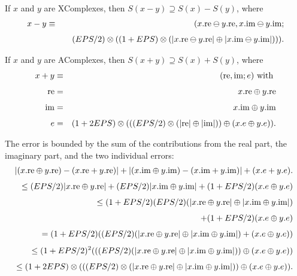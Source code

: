 If $x$ and $y$ are {\rm XComplexes,} then 
$S(x - y) \supseteq S(x) - S(y)${\rm ,} where
\begin{eqnarray*}
x - y &\equiv& (x.{\rm re} \ominus y.{\rm re}, x.{\rm im} \ominus y.{\rm im};\\[4pt]
&&\quad 
(EPS/2)\otimes ((1 + EPS) \otimes (|x.{\rm re} \ominus y.{\rm re}| \oplus |x.{\rm im} \ominus y.{\rm im}|))).
\end{eqnarray*} \endproclaim


If $x$ and $y$ are {\rm AComplexes,} then 
$S(x + y) \supseteq S(x) + S(y)${\rm ,} where
\begin{eqnarray*}
 x+y &\equiv& ({\rm re},{\rm im};e) \hbox{ with }\\[4pt]
{\rm re}& =& x.{\rm re} \oplus y.{\rm re}\\[4pt]
{\rm im}& =& x.{\rm im} \oplus y.{\rm im}\\[4pt]
e& =& (1 + 2 EPS) \otimes ( ((EPS/2) \otimes (|{\rm re}| \oplus |{\rm im}|))
 \oplus (x.e \oplus y.e)). \end{eqnarray*}
\endproclaim

The error is bounded by the sum of the contributions from the real part, the imaginary part, and the two individual errors:
\begin{eqnarray*}
 & &\hskip-20pt |(x.{\rm re} \oplus y.{\rm re}) -(x.{\rm re} + y.{\rm re})| + |(x.{\rm im} \oplus y.{\rm im}) -
(x.{\rm im} + y.{\rm im})| + (x.e + y.e).\\[4pt]
&&\hskip-12pt \le (EPS/2) |x.{\rm re} \oplus y.{\rm re}| + (EPS/2) |x.{\rm im} \oplus y.{\rm im}| + 
(1 + EPS/2) (x.e \oplus y.e)\\[4pt]
&&\hskip-12pt \le  (1 + EPS/2) (EPS/2)(|x.{\rm re} \oplus y.{\rm re}| \oplus 
 |x.{\rm im} \oplus y.{\rm im}| ) \\[4pt]
&&\hskip-12pt \qquad + (1 + EPS/2) (x.e \oplus y.e)\\[4pt]
&&\hskip-12pt = (1 + EPS/2) ((EPS/2)(|x.{\rm re} \oplus y.{\rm re}| \oplus 
 |x.{\rm im} \oplus y.{\rm im}| ) + (x.e \oplus y.e))\\[4pt]
&&\hskip-12pt \le (1 + EPS/2)^2 (((EPS/2) (|x.{\rm re} \oplus y.{\rm re}| \oplus 
 |x.{\rm im} \oplus y.{\rm im}| )) \oplus  (x.e \oplus y.e))\\[4pt]
&&\hskip-12pt \le   (1 + 2 EPS) \otimes (((EPS/2)\otimes (|x.{\rm re} \oplus
y.{\rm re}| \oplus |x.{\rm im} \oplus y.{\rm im}| )) \oplus (x.e \oplus y.e)).\\[4pt]
\noalign{\vskip-24pt}
\end{eqnarray*}
\enddemo

